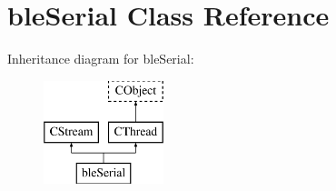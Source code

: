 \hypertarget{classble_serial}{\section{ble\-Serial Class Reference}
\label{classble_serial}
}
Inheritance diagram for ble\-Serial\-:\begin{figure}[H]
\begin{center}
\leavevmode
\includegraphics[height=3.000000cm]{classble_serial}
\end{center}
\end{figure}
